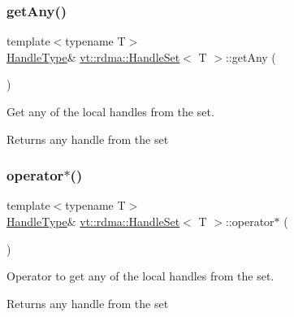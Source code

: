 \subsubsection{\texorpdfstring{get\+Any()}{getAny()}}
{\footnotesize\ttfamily template$<$typename T$>$ \\
\hyperlink{structvt_1_1rdma_1_1_handle_set_ab3a698ee86bae503dfa84617205b2dd9}{Handle\+Type}\& \hyperlink{structvt_1_1rdma_1_1_handle_set}{vt\+::rdma\+::\+Handle\+Set}$<$ T $>$\+::get\+Any (\begin{DoxyParamCaption}{ }\end{DoxyParamCaption})\hspace{0.3cm}{\ttfamily [inline]}}



Get any of the local handles from the set. 

\begin{DoxyReturn}{Returns}
any handle from the set 
\end{DoxyReturn}
\mbox{\label{structvt_1_1rdma_1_1_handle_set_a9ad10a3906540909c0344bbf84789fba}} 
\subsubsection{\texorpdfstring{operator$\ast$()}{operator*()}}
{\footnotesize\ttfamily template$<$typename T$>$ \\
\hyperlink{structvt_1_1rdma_1_1_handle_set_ab3a698ee86bae503dfa84617205b2dd9}{Handle\+Type}\& \hyperlink{structvt_1_1rdma_1_1_handle_set}{vt\+::rdma\+::\+Handle\+Set}$<$ T $>$\+::operator$\ast$ (\begin{DoxyParamCaption}{ }\end{DoxyParamCaption})\hspace{0.3cm}{\ttfamily [inline]}}



Operator to get any of the local handles from the set. 

\begin{DoxyReturn}{Returns}
any handle from the set 
\end{DoxyReturn}
\mbox{\label{structvt_1_1rdma_1_1_handle_set_a0f19b37d4a11e43a1ab68710b9d15404}} 
